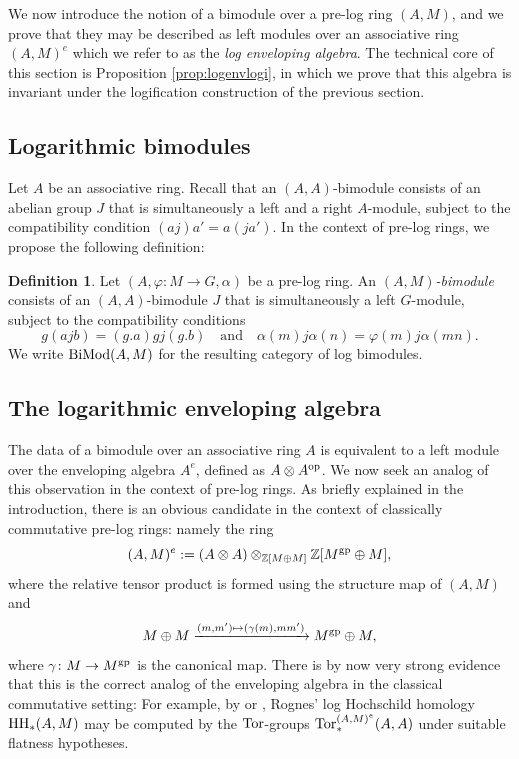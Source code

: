 \documentclass[a4paper,10pt%
]{amsart}
\numberwithin{equation}{section}
\theoremstyle{definition}
\newtheorem{definition}[subsection]{Definition}
\renewcommand{\:}{\colon}
\begin{document}
We now introduce the notion of a bimodule over a pre-log ring $(A, M)$, and we prove that they may be described as left modules over an associative ring $(A, M)^e$ which we refer to as the \emph{log enveloping algebra}. The technical core of this section is Proposition \ref{prop:logenvlogi}, in which we prove that this algebra is invariant under the logification construction of the previous section. 

\subsection{Logarithmic bimodules} Let $A$ be an associative ring. Recall that an $(A, A)$-bimodule consists of an abelian group $J$ that is simultaneously a left and a right $A$-module, subject to the compatibility condition $(aj)a' = a(ja')$. In the context of pre-log rings, we propose the following definition:

\begin{definition}\label{def:logbimod} Let $(A, \varphi \colon M \to G, \alpha)$ be a pre-log ring. An \emph{$(A, M)$-bimodule} consists of an $(A, A)$-bimodule $J$ that is simultaneously a left $G$-module, subject to the compatibility conditions \[g(ajb) = (g.a)gj(g.b) \quad \text{and} \quad \alpha(m)j\alpha(n) = \varphi(m)j\alpha(mn).\] We write ${\rm BiMod}(A, M)$ for the resulting category of log bimodules. 
\end{definition}

\subsection{The logarithmic enveloping algebra} The data of a bimodule over an associative ring $A$ is equivalent to a left module over the enveloping algebra $A^e$, defined as $A \otimes A^{\rm op}$. We now seek an analog of this observation in the context of pre-log rings. As briefly explained in the introduction, there is an obvious candidate in the context of classically commutative pre-log rings: namely the ring \[(A, M)^e := (A \otimes A) \otimes_{{\Bbb Z}[M \oplus M]} {\Bbb Z}[M^{\rm gp} \oplus M],\] where the relative tensor product is formed using the structure map of $(A, M)$ and \begin{equation}\label{eq:shearing}M \oplus M \xrightarrow{(m, m') \mapsto (\gamma(m), mm')} M^{\rm gp} \oplus M,\end{equation} where $\gamma \colon M \to M^{\rm gp}$ is the canonical map. There is by now very strong evidence that this is the correct analog of the enveloping algebra in the classical commutative setting: For example, by \cite[Section 13]{Rog09} or \cite[Proposition 1.4]{BLPO23a}, Rognes' log Hochschild homology ${\rm HH}_*(A, M)$ may be computed by the ${\rm Tor}$-groups ${\rm Tor}_*^{(A, M)^e}(A, A)$ under suitable flatness hypotheses. 
\end{document}

